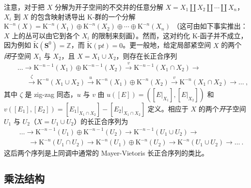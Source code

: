 \documentclass[11pt,a4paper]{ctexart}
\newcommand{\SrcRange}[2]{\marginpar{\raggedright\footnotesize 原文 p.#1}}
\begin{document}
注意，对于把 \(X\) 分解为开子空间的不交并的任意分解 \(X=X_1\amalg X_2\amalg\cdots\amalg X_n\)，\(X_i\) 到 \(X\) 的包含映射诱导出 K-群的一个分解 \({\mathrm K}^{-n}(X)={\mathrm K}^{-n}(X_1)\oplus{\mathrm K}^{-n}(X_2)\oplus\cdots\oplus{\mathrm K}^{-n}(X_n)\) （这可由如下事实推出：\(X\) 上的丛可以由它到各个 \(X_i\) 的限制来刻画）。然而，这对约化 K-函子并不成立，因为例如 \(\widetilde{{\mathrm K}}({\mathbf S}^0)={\mathbb{Z}}\)，而 \(\widetilde{{\mathrm K}}({\mathrm pt})=0\)。更一般地，给定局部紧空间 \(X\) 的两个\emph{闭}子空间 \(X_1\) 与 \(X_2\)，且 \(X=X_1\cup X_2\)，则存在长正合序列 \[\begin{matrix}
& &\ldots\longrightarrow{\mathrm K}^{-n-1}(X_1)\oplus{\mathrm K}^{-n-1}(X_2)
\stackrel{v}{\longrightarrow}
{\mathrm K}^{-n-1}(X_1\cap X_2)\longrightarrow\\
& &~~~~~~\stackrel{\zeta}{\longrightarrow}{\mathrm K}^{-n}(X_1\cup X_2)
\stackrel{u}{\longrightarrow}{\mathrm K}^{-n}(X_1)\oplus {\mathrm K}^{-n}(X_2)
\stackrel{v}{\longrightarrow}{\mathrm K}^{-n}(X_1\cap X_2)\longrightarrow\ldots\ ,
\end{matrix}\] 其中 \(\zeta\) 是 zig-zag 同态，\(u\) 与 \(v\) 由 \(u([E])=\left([E|_{X_1}],[E|_{X_2}]\right)\) 和 \(v([E_1],[E_2])
=[E_1|_{X_1\cap X_2}]-[E_2|_{X_1\cap X_2}]\) 定义。相应于 \(X\) 的两个\emph{开}子空间 \(U_1\) 与 \(U_2\)（\(X=U_1\cup U_2\)）的长正合序列为 \[\begin{matrix}
& &\ldots\longrightarrow{\mathrm K}^{-n-1}(U_1)\oplus{\mathrm K}^{-n-1}(U_2)\longrightarrow
{\mathrm K}^{-n-1}(U_1\cup U_2)\longrightarrow\\
& &~~~~~~\longrightarrow{\mathrm K}^{-n}(U_1\cap U_2)
\longrightarrow{\mathrm K}^{-n}(U_1)\oplus {\mathrm K}^{-n}(U_2)
\longrightarrow{\mathrm K}^{-n}(U_1\cup U_2)\longrightarrow\ldots\ .
\end{matrix}\] 这后两个序列是上同调中通常的 Mayer-Vietoris 长正合序列的类比。

\SrcRange{18}{18}
\subsection{乘法结构}\label{ux4e58ux6cd5ux7ed3ux6784}
\end{document}
